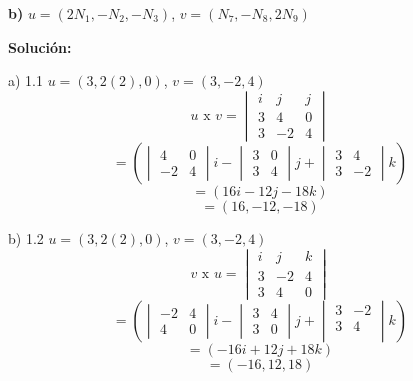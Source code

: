 \documentclass{article}
\begin{document}
\textbf{b)} $u =(2N_1, -N_2, -N_3)$, $v = (N_7, -N_8, 2N_9)$
\vspace{10pt}

\textbf{Solución:}
\vspace{10pt}


\hspace*{-2cm}\begin{minipage}[c]{6cm}
    a) 1.1 $u = (3, 2(2), 0)$, $v = (3, -2, 4)$
    $$u\text{ x }v = \begin{vmatrix}
        i & j & j \\
        3 & 4 & 0 \\
        3 & -2 & 4
    \end{vmatrix}$$
    $$= \left(\begin{vmatrix}
        4& 0 \\
        -2 & 4 
    \end{vmatrix}i -\begin{vmatrix}
        3 & 0 \\
        3 & 4
    \end{vmatrix}j + \begin{vmatrix}
        3 & 4 \\
        3 & -2 
    \end{vmatrix}k \right)$$
    $$= (16i-12j-18k)$$
    $$=(16, -12, -18)$$
\end{minipage}\hspace*{4cm}\begin{minipage}[c]{6cm}
    b) 1.2  $u = (3, 2(2), 0)$, $v = (3, -2, 4)$
    $$v \text{ x }u = \begin{vmatrix}
        i & j & k \\
        3 & -2 & 4 \\
        3 & 4 & 0
    \end{vmatrix}$$
    $$ = \left(\begin{vmatrix}
        -2 & 4 \\
        4 & 0 
    \end{vmatrix}i - \begin{vmatrix}
        3 & 4 \\
        3 & 0
    \end{vmatrix}j +\begin{vmatrix}
        3 & -2 \\
        3 & 4 \\ 
    \end{vmatrix}k\right)$$
    $$=(-16i+12j +18k)$$
    $$=(-16, 12, 18)$$
\end{minipage}
\vspace{10pt}
\end{document}
